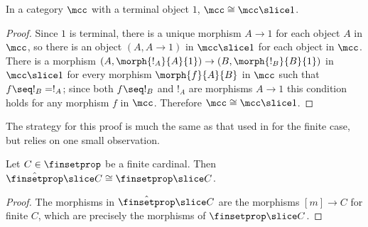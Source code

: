 \begin{lemma}
    \label{lem:slice-iso-terminal}
    In a category \(\mcc\) with a terminal object \(1\),
    \(\mcc \cong \mcc \slice 1\).
\end{lemma}
\begin{proof}
    Since \(1\) is terminal, there is a unique morphism \(A \to 1\) for each
    object \(A\) in \(\mcc\), so there is an object \((A, A \to 1)\) in
    \(\mcc \slice 1\) for each object in \(\mcc\).
    There is a morphism \((A, \morph{!_A}{A}{1}) \to (B, \morph{!_B}{B}{1})\) in
    \(\mcc \slice 1\) for every morphism \(\morph{f}{A}{B}\) in \(\mcc\) such
    that \(f \seq !_B = !_A\); since both \(f \seq !_B\) and \(!_A\) are
    morphisms \(A \to 1\) this condition holds for any morphism \(f\) in
    \(\mcc\).
    Therefore \(\mcc \cong \mcc \slice 1\).
\end{proof}

The strategy for this proof is much the same as that used in
\cite{bonchi2022string} for the finite case, but relies on one small
observation.

\begin{lemma}
    \label{lem:finsetprop-finite}
    Let \(C \in \finsetprop\) be a finite cardinal.
    Then \(\hat{\finsetprop} \slice C \cong \finsetprop \slice C\).
\end{lemma}
\begin{proof}
    The morphisms in \(\hat{\finsetprop} \slice C\) are the morphisms
    \([m] \to C\) for finite \(C\), which are precisely the morphisms of
    \(\finsetprop \slice C\).
\end{proof}

